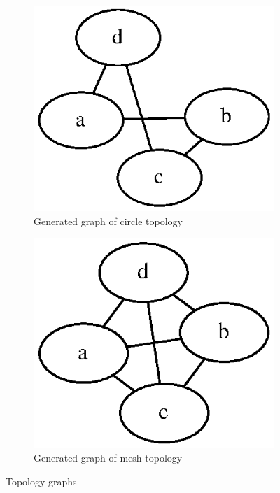 \documentclass[12pt]{article}
\begin{document}
\begin{figure}[htp]
    \begin{subfigure}[b]{0.5\linewidth}
        \centering
        \includegraphics[scale=0.5]{images/circ-graph.eps}
        \caption{Generated graph of circle topology}
        \label{fig:full_circ_graph}
    \end{subfigure}
    \begin{subfigure}[b]{0.5\linewidth}
        \centering
        \includegraphics[scale=0.5]{images/mesh-graph.eps}
        \caption{Generated graph of mesh topology}
        \label{fig:full_mesh_graph}
    \end{subfigure}
    \caption{Topology graphs}
\end{figure}

\pagebreak
\end{document}
